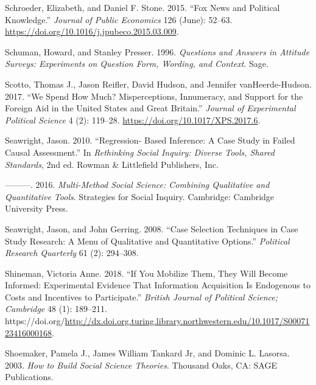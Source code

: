 \documentclass{book}
\newlength{\cslhangindent}
\newlength{\cslentryspacingunit} %
\newenvironment{CSLReferences}[2] %
 {%
  \setlength{\parindent}{0pt}
  \ifodd #1
  \let\oldpar\par
  \def\par{\hangindent=\cslhangindent\oldpar}
  \fi
  \setlength{\parskip}{#2\cslentryspacingunit}
 }%
 {}
\begin{document}
\begin{CSLReferences}{1}{0}
\leavevmode{}%
Schroeder, Elizabeth, and Daniel F. Stone. 2015. {``Fox {News} and Political
Knowledge.''} \emph{Journal of Public Economics} 126 (June): 52--63.
\url{https://doi.org/10.1016/j.jpubeco.2015.03.009}.

\leavevmode{}%
Schuman, Howard, and Stanley Presser. 1996. \emph{Questions and Answers in
Attitude Surveys: Experiments on Question Form, Wording, and Context}. Sage.

\leavevmode{}%
Scotto, Thomas J., Jason Reifler, David Hudson, and Jennifer vanHeerde-Hudson.
2017. {``We Spend How Much? Misperceptions, Innumeracy, and Support for the
Foreign Aid in the United States and Great Britain.''} \emph{Journal of
Experimental Political Science} 4 (2): 119--28.
\url{https://doi.org/10.1017/XPS.2017.6}.

\leavevmode{}%
Seawright, Jason. 2010. {``Regression- {Based Inference}: {A Case Study} in
{Failed Causal Assessment}.''} In \emph{Rethinking {Social Inquiry}: {Diverse
Tools}, {Shared Standards}}, 2nd ed. {Rowman \& Littlefield Publishers, Inc}.

\leavevmode{}%
---------. 2016. \emph{Multi-{Method Social Science}: {Combining Qualitative}
and {Quantitative Tools}}. Strategies for {Social Inquiry}. {Cambridge}:
{Cambridge University Press}.

\leavevmode{}%
Seawright, Jason, and John Gerring. 2008. {``Case Selection Techniques in Case
Study Research: A Menu of Qualitative and Quantitative Options.''}
\emph{Political Research Quarterly} 61 (2): 294--308.

\leavevmode{}%
Shineman, Victoria Anne. 2018. {``If {You} {Mobilize} {Them}, {They} {Will}
{Become} {Informed}: {Experimental} {Evidence} That {Information}
{Acquisition} {Is} {Endogenous} to {Costs} and {Incentives} to
{Participate}.''} \emph{British Journal of Political Science; Cambridge} 48
(1): 189--211.
https://doi.org/\url{http://dx.doi.org.turing.library.northwestern.edu/10.1017/S0007123416000168}.

\leavevmode{}%
Shoemaker, Pamela J., James William Tankard Jr, and Dominic L. Lasorsa. 2003.
\emph{How to {Build Social Science Theories}}. Thousand Oaks, CA: {SAGE
Publications}.


\end{CSLReferences}
\end{document}
